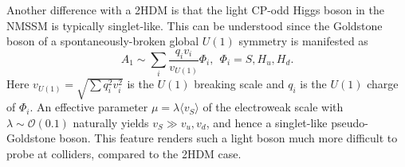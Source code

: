 \documentclass[preprintnumbers,superscriptaddress,nofootinbib,aps,prd,floatfix]{revtex4}
\begin{document}
Another difference with a 2HDM is that the light CP-odd Higgs boson in the NMSSM is typically singlet-like. This can be understood since the Goldstone boson of a spontaneously-broken global $U(1)$ symmetry is manifested as  
\begin{equation}
A_1 \sim \sum_i \frac{q_i v_i}{v_{U(1)}} \Phi_i, \ \ \Phi_i = S, H_u, H_d.
\end{equation}
Here $v_{U(1)} = \sqrt{\sum q_i^2 v_i^2}$ is the $U(1)$ breaking scale and $q_i$ is the $U(1)$ charge of $\Phi_i$. An effective parameter $\mu = \lambda \langle v_S\rangle $ of the electroweak scale with  $\lambda \sim \mathcal O(0.1)$ naturally yields $v_S \gg v_u, v_d$, and hence a singlet-like pseudo-Goldstone boson. This feature renders such a light boson much more difficult to probe at colliders, compared to the 2HDM case. 
\end{document}
